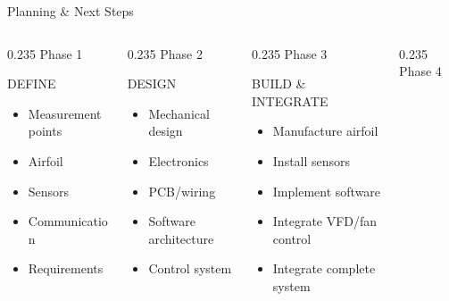 \documentclass[aspectratio=169,10pt]{beamer}
\newenvironment{points}{\begin{itemize}\setlength{\itemsep}{0.45em}}{\end{itemize}}
\begin{document}
\begin{frame}{Planning \& Next Steps}
  \begin{columns}[T,onlytextwidth]
    \begin{column}{0.235\textwidth}
      \textcolor{structure.fg}{Phase 1}
      \begin{block}{DEFINE}
        \begin{points}
          \item Measurement points
          \item Airfoil
          \item Sensors
          \item Communication
          \item Requirements
        \end{points}
      \end{block}
    \end{column}
    \begin{column}{0.235\textwidth}
      \textcolor{structure.fg}{Phase 2}
      \begin{block}{DESIGN}
        \begin{points}
          \item Mechanical design
          \item Electronics
          \item PCB/wiring
          \item Software architecture
          \item Control system
        \end{points}
      \end{block}
    \end{column}
    \begin{column}{0.235\textwidth}
      \textcolor{structure.fg}{Phase 3}
      \begin{block}{BUILD \& INTEGRATE}
        \begin{points}
          \item Manufacture airfoil
          \item Install sensors
          \item Implement software
          \item Integrate VFD/fan control
          \item Integrate complete system
        \end{points}
      \end{block}
    \end{column}
    \begin{column}{0.235\textwidth}
      \textcolor{structure.fg}{Phase 4}

\end{column}
\end{columns}
\end{frame}
\end{document}
